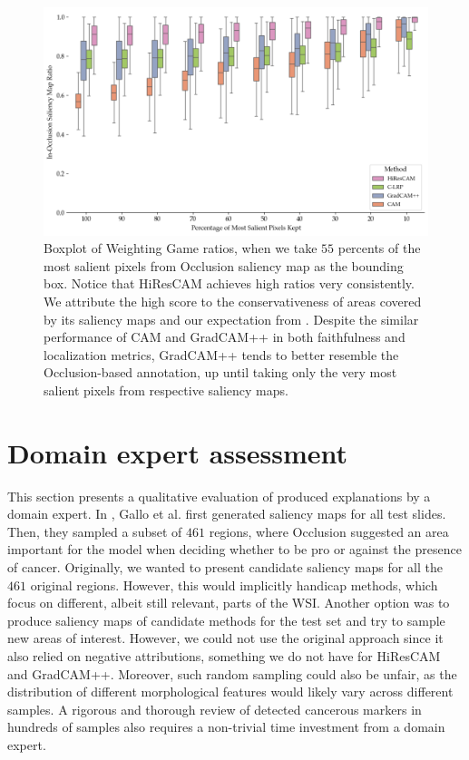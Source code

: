 \begin{figure}
    \begin{center}
    \begin{minipage}{1\textwidth}
      \includegraphics[width=\textwidth]{img/occlusion-weighting-game-boxplot.png}
    \end{minipage}
    \caption{Boxplot of Weighting Game ratios, when we take $55$ percents of the most salient pixels from Occlusion saliency map as the bounding box. Notice that HiResCAM achieves high ratios very consistently. We attribute the high score to the conservativeness of areas covered by its saliency maps and our expectation from . Despite the similar performance of CAM and GradCAM++ in both faithfulness and localization metrics, GradCAM++ tends to better resemble the Occlusion-based annotation, up until taking only the very most salient pixels from respective saliency maps.}
    \label{fig:occ-weighting-game-boxplot}
    \end{center}
\end{figure}

\section{Domain expert assessment}

This section presents a qualitative evaluation of produced explanations by a domain expert.
In \cite{gallo}, Gallo et al. first generated saliency maps for all test slides.
Then, they sampled a subset of $461$ regions, where Occlusion suggested an area important for the model when deciding whether to be pro or against the presence of cancer.
Originally, we wanted to present candidate saliency maps for all the $461$ original regions.
However, this would implicitly handicap methods, which focus on different, albeit still relevant, parts of the WSI. 
Another option was to produce saliency maps of candidate methods for the test set and try to sample new areas of interest. However, we could not use the original approach since it also relied on negative attributions, something we do not have for HiResCAM and GradCAM++.
Moreover, such random sampling could also be unfair, as the distribution of different morphological features would likely vary across different samples.
A rigorous and thorough review of detected cancerous markers in hundreds of samples also requires a non-trivial time investment from a domain expert.

